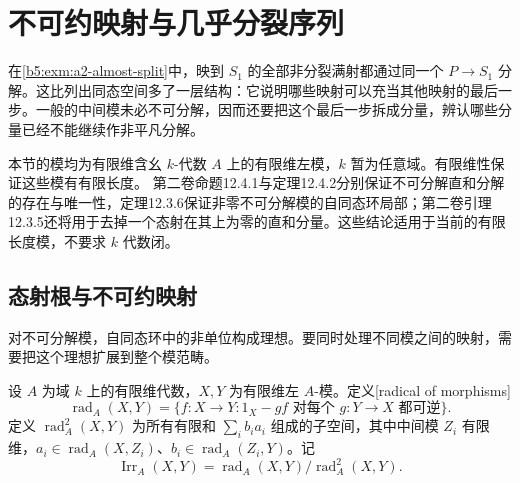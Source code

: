 
\section{不可约映射与几乎分裂序列}
\label{b5:sec:1005}

在\cref{b5:exm:a2-almost-split}中，映到 \(S_1\) 的全部非分裂满射都通过同一个 \(P\to S_1\) 分解。这比列出同态空间多了一层结构：它说明哪些映射可以充当其他映射的最后一步。一般的中间模未必不可分解，因而还要把这个最后一步拆成分量，辨认哪些分量已经不能继续作非平凡分解。

\ProseParagraphBreak
本节的模均为有限维含幺 \(k\)-代数 \(A\) 上的有限维左模，\(k\) 暂为任意域。有限维性保证这些模有有限长度。
第二卷命题12.4.1与定理12.4.2分别保证不可分解直和分解的存在与唯一性，定理12.3.6保证非零不可分解模的自同态环局部；第二卷引理12.3.5还将用于去掉一个态射在其上为零的直和分量。这些结论适用于当前的有限长度模，不要求 \(k\) 代数闭。

\subsection{态射根与不可约映射}
\label{b5:subsec:1005:01}

对不可分解模，自同态环中的非单位构成理想。要同时处理不同模之间的映射，需要把这个理想扩展到整个模范畴。

\begin{definition}\label{b5:def:morphism-radical}
	设 \(A\) 为域 \(k\) 上的有限维代数，\(X,Y\) 为有限维左 \(A\)-模。定义[radical of morphisms]
	\[
		\operatorname{rad}_A(X,Y)=\{f:X\to Y:1_X-gf\text{ 对每个 }g:Y\to X\text{ 都可逆}\}.
	\]
	定义 \(\operatorname{rad}_A^2(X,Y)\) 为所有有限和 \(\sum_i b_i a_i\) 组成的子空间，其中中间模 \(Z_i\) 有限维，\(a_i\in\operatorname{rad}_A(X,Z_i)\)、\(b_i\in\operatorname{rad}_A(Z_i,Y)\)。记
	\[
		\operatorname{Irr}_A(X,Y)=\operatorname{rad}_A(X,Y)/\operatorname{rad}_A^2(X,Y).
	\]
\end{definition}


